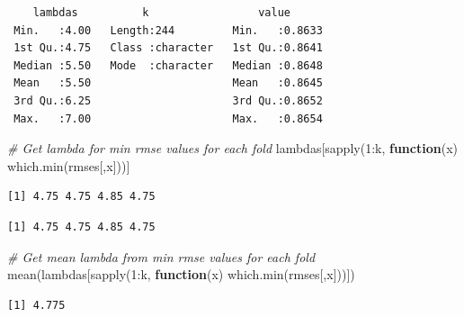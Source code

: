 \documentclass[
]{article}
\newenvironment{Shaded}{}{}
\newcommand{\CommentTok}[1]{\textcolor[rgb]{0.38,0.63,0.69}{\textit{#1}}}
\newcommand{\ControlFlowTok}[1]{\textcolor[rgb]{0.00,0.44,0.13}{\textbf{#1}}}
\newcommand{\DecValTok}[1]{\textcolor[rgb]{0.25,0.63,0.44}{#1}}
\newcommand{\FunctionTok}[1]{\textcolor[rgb]{0.02,0.16,0.49}{#1}}
\newcommand{\NormalTok}[1]{#1}
\newcommand{\SpecialCharTok}[1]{\textcolor[rgb]{0.25,0.44,0.63}{#1}}
\begin{document}
\begin{verbatim}
    lambdas          k                 value       
 Min.   :4.00   Length:244         Min.   :0.8633  
 1st Qu.:4.75   Class :character   1st Qu.:0.8641  
 Median :5.50   Mode  :character   Median :0.8648  
 Mean   :5.50                      Mean   :0.8645  
 3rd Qu.:6.25                      3rd Qu.:0.8652  
 Max.   :7.00                      Max.   :0.8654  
\end{verbatim}

\begin{Shaded}
\begin{Highlighting}[]
\CommentTok{\# Get lambda for min rmse values for each fold}
\NormalTok{lambdas[}\FunctionTok{sapply}\NormalTok{(}\DecValTok{1}\SpecialCharTok{:}\NormalTok{k, }\ControlFlowTok{function}\NormalTok{(x) }\FunctionTok{which.min}\NormalTok{(rmses[,x]))]}
\end{Highlighting}
\end{Shaded}

\begin{verbatim}
[1] 4.75 4.75 4.85 4.75
\end{verbatim}

\begin{Shaded}
\end{Shaded}

\begin{verbatim}
[1] 4.75 4.75 4.85 4.75
\end{verbatim}

\begin{Shaded}
\begin{Highlighting}[]
\CommentTok{\# Get mean lambda from min rmse values for each fold}
\FunctionTok{mean}\NormalTok{(lambdas[}\FunctionTok{sapply}\NormalTok{(}\DecValTok{1}\SpecialCharTok{:}\NormalTok{k, }\ControlFlowTok{function}\NormalTok{(x) }\FunctionTok{which.min}\NormalTok{(rmses[,x]))])}
\end{Highlighting}
\end{Shaded}

\begin{verbatim}
[1] 4.775
\end{verbatim}
\end{document}
